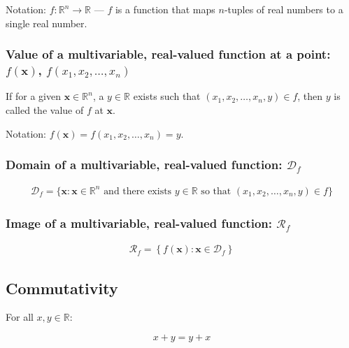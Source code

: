 \documentclass[titlepage]{article}
\begin{document}
        Notation: $f : \mathbb{R}^n \rightarrow \mathbb{R}$ --- $f$ is a
        function that maps $n$-tuples of real numbers to a single real number.

        \subsubsection{%
          Value of a multivariable, real-valued function at a point:
          $f(\mathbf{x})$, $f(x_1, x_2, \ldots, x_n)$
        }

          If for a given $\mathbf{x} \in \mathbb{R}^n$, a $y \in \mathbb{R}$
          exists such that $(x_1, x_2, \dots, x_n, y) \in f$, then $y$ is called
          the value of $f$ at $\mathbf{x}$.

          Notation: $f(\mathbf{x}) = f(x_1, x_2, \ldots, x_n) = y$.

        \subsubsection{%
          Domain of a multivariable, real-valued function: $\mathcal{D}_f$
        }

          \begin{align*}
            \mathcal{D}_f
              = \{
                  \mathbf{x}
                  : \mathbf{x} \in \mathbb{R}^n
                    \text{ and there exists } y \in \mathbb{R}
                    \text{ so that } (x_1, x_2, \dots, x_n, y) \in f
                \}
          \end{align*}

        \subsubsection{%
          Image of a multivariable, real-valued function: $\mathcal{R}_f$
        }

          \begin{align*}
            \mathcal{R}_f
              = \left\{ f(\mathbf{x}) : \mathbf{x} \in \mathcal{D}_f\right\}
          \end{align*}

      \subsection{Commutativity}

        For all $x, y \in \mathbb{R}$:

        $$x + y = y + x$$
\end{document}
